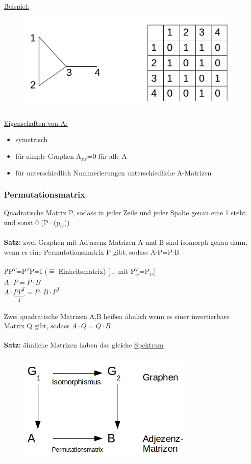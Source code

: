 \underline{Beispiel:}\\
\begin{figure}[htp]
\centering
\includegraphics[scale=1]{lectures/161021/pix/pic11.jpg}
\end{figure}

\underline{Eigenschaften von A:}
\begin{itemize}
	\item symetrisch
	\item für simple Graphen A$_{xx}$=0 für alle A
	\item für unterschiedlich Nummerierungen unterschiedliche A-Matrizen
\end{itemize}

\subsubsection{Permutationsmatrix}
Quadratische Matrix P, sodass in jeder Zeile und jeder Spalte genau eine 1 steht und sonst 0 (P=(p$_{ij}$))
\\\\
\textbf{Satz:} zwei Graphen mit Adjazenz-Matrizen A und B sind isomorph genau dann, wenn es eine Permutationsmatrix P gibt, sodass A$\cdot$P=P$\cdot$B
\\\\
PP$^T$=P$^T$P=I ($\widehat{=}$ Einheitsmatrix) [... mit P$^T_{ij}$=P$_{ji}$]\\
$A \cdot P = P \cdot B$\\
$A \cdot \underbrace{PP^T}_{I}=P \cdot B \cdot P^T$
\\\\
Zwei quadratische Matrizen A,B heißen ähnlich wenn es einer invertierbare Matrix Q gibt, sodass $A \cdot Q = Q \cdot B$
\\\\
\textbf{Satz:} ähnliche Matrizen haben das gleiche \underline{Spektrum}
\begin{figure}[htp]
\centering
\includegraphics[scale=1]{lectures/161021/pix/pic12.jpg}
\end{figure}

